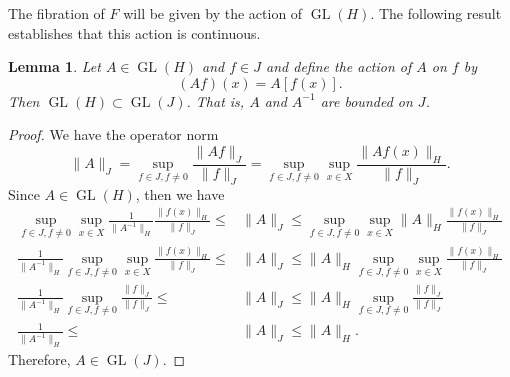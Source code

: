\documentclass{article}
\newtheorem{lemma}[defn]{Lemma}
\newcommand{\GL}{\operatorname{GL}}
\begin{document}
The fibration of $F$ will be given by the action of $\GL(H)$. The following result establishes that this action is continuous.
\begin{lemma}
Let $A\in\GL(H)$ and $f\in J$ and define the action of $A$ on $f$ by
\[ (Af)(x) = A[f(x)]. \]
Then $\GL(H)\subset \GL(J)$. That is, $A$ and $A^{-1}$ are bounded on $J$.
\end{lemma}
\begin{proof}
We have the operator norm
\[ \|A\|_J = \sup_{f\in J,f\neq 0} \frac{\|Af\|_J}{\|f\|_J}
= \sup_{f\in J,f\neq 0}\sup_{x\in X} \frac{\|Af(x)\|_H}{\|f\|_J}. \]
Since $A\in\GL(H)$, then we have
\begin{align*}
\sup_{f\in J,f\neq 0}\sup_{x\in X} \frac{1}{\|A^{-1}\|_H}\frac{\|f(x)\|_H}{\|f\|_J} \leq &\|A\|_J \leq \sup_{f\in J,f\neq 0}\sup_{x\in X} \|A\|_H \frac{\|f(x)\|_H}{\|f\|_J} \\
\frac{1}{\|A^{-1}\|_H} \sup_{f\in J,f\neq 0}\sup_{x\in X}\frac{\|f(x)\|_H}{\|f\|_J} \leq &\|A\|_J \leq \|A\|_H\sup_{f\in J,f\neq 0}\sup_{x\in X}\frac{\|f(x)\|_H}{\|f\|_J} \\
\frac{1}{\|A^{-1}\|_H}\sup_{f\in J,f\neq 0} \frac{\|f\|_J}{\|f\|_J} \leq &\|A\|_J \leq \|A\|_H\sup_{f\in J,f\neq 0} \frac{\|f\|_J}{\|f\|_J} \\
\frac{1}{\|A^{-1}\|_H} \leq &\|A\|_J \leq \|A\|_H.
\end{align*}
Therefore, $A\in\GL(J)$.
\end{proof}
\end{document}
